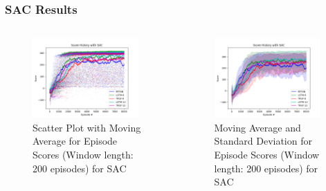 \documentclass{beamer}
\begin{document}
\begin{frame}
\frametitle{SAC Results}
\begin{columns}[onlytextwidth]
	\begin{column}{.49\textwidth}
		\begin{figure}[!ht]
			\centering
			\includegraphics[width=0.95\textwidth]{figures/bipedal/SCT_SAC_RFFNN_LSTM-6_TRSF-6_LSTM-12_TRSF-12.png}
			\caption{Scatter Plot with Moving Average for Episode Scores (Window length: 200 episodes) for SAC}
			\label{fig:sac_scatter_ep_rewards}
		\end{figure}
	\end{column}
	\begin{column}{.49\textwidth}
		\begin{figure}[!ht]
			\centering
			\includegraphics[width=0.95\textwidth]{figures/bipedal/STD_SAC_RFFNN_LSTM-6_TRSF-6_LSTM-12_TRSF-12.png}
			\caption{Moving Average and Standard Deviation for Episode Scores (Window length: 200 episodes) for SAC}
			\label{fig:sac_std_ep_rewards}
		\end{figure} 
	\end{column}
\end{columns}
\end{frame}
\end{document}
